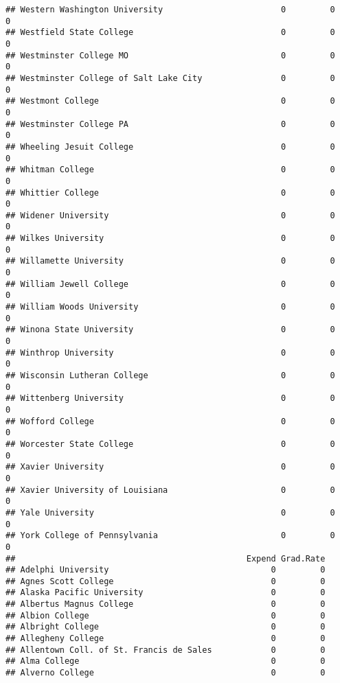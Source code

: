 \documentclass[
]{article}
\begin{document}
\begin{verbatim}
## Western Washington University                        0         0           0
## Westfield State College                              0         0           0
## Westminster College MO                               0         0           0
## Westminster College of Salt Lake City                0         0           0
## Westmont College                                     0         0           0
## Westminster College PA                               0         0           0
## Wheeling Jesuit College                              0         0           0
## Whitman College                                      0         0           0
## Whittier College                                     0         0           0
## Widener University                                   0         0           0
## Wilkes University                                    0         0           0
## Willamette University                                0         0           0
## William Jewell College                               0         0           0
## William Woods University                             0         0           0
## Winona State University                              0         0           0
## Winthrop University                                  0         0           0
## Wisconsin Lutheran College                           0         0           0
## Wittenberg University                                0         0           0
## Wofford College                                      0         0           0
## Worcester State College                              0         0           0
## Xavier University                                    0         0           0
## Xavier University of Louisiana                       0         0           0
## Yale University                                      0         0           0
## York College of Pennsylvania                         0         0           0
##                                               Expend Grad.Rate
## Adelphi University                                 0         0
## Agnes Scott College                                0         0
## Alaska Pacific University                          0         0
## Albertus Magnus College                            0         0
## Albion College                                     0         0
## Albright College                                   0         0
## Allegheny College                                  0         0
## Allentown Coll. of St. Francis de Sales            0         0
## Alma College                                       0         0
## Alverno College                                    0         0

\end{verbatim}
\end{document}
